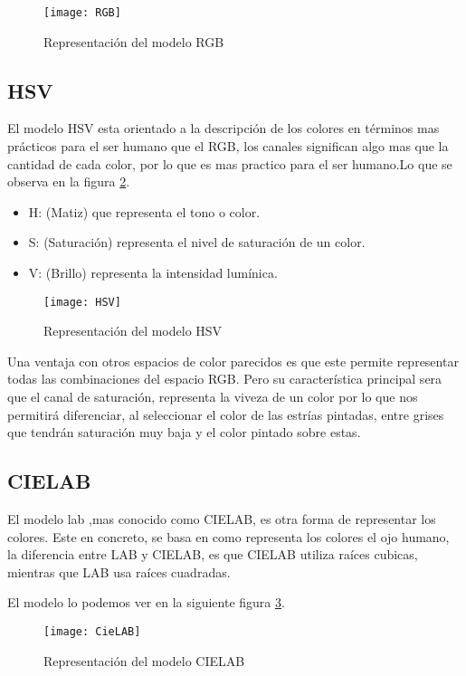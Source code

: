 \begin{figure}[h]
\centering
\texttt{[image: RGB]}
\caption{Representación del modelo RGB\cite{Manual:HAE}}
\label{fig:3.3}
\end{figure}

\subsection{HSV}
El modelo HSV \cite{modelo:hsv} esta orientado a la descripción de los colores en términos mas prácticos para el ser humano que el RGB, los canales significan algo mas que la cantidad de cada color, por lo que es mas practico para el ser humano.Lo que se observa en la figura \ref{fig:3.4}.
 
\begin{itemize}
	\item H: (Matiz) que representa el tono o color.
	\item S: (Saturación) representa el nivel de saturación de un color.
	\item V: (Brillo) representa la intensidad lumínica.
\end{itemize}

\begin{figure}[h]
\centering
\texttt{[image: HSV]}
\caption{Representación del modelo HSV\cite{Manual:HAE}}
\label{fig:3.4}
\end{figure}

Una ventaja con otros espacios de color parecidos es que este permite representar todas las combinaciones del espacio RGB.
Pero su característica principal sera que el canal de saturación, representa la viveza de un color por lo que nos permitirá diferenciar, al seleccionar el color de las estrías pintadas, entre grises que tendrán saturación muy baja y el color pintado sobre estas.

\subsection{CIELAB}
El modelo lab \cite{wiki:lab},mas conocido como CIELAB, es otra forma de representar los colores. Este en concreto, se basa en como representa los colores el ojo humano, la diferencia entre LAB y CIELAB, es que CIELAB utiliza raíces cubicas, mientras que LAB usa raíces cuadradas.

El modelo lo podemos ver en la siguiente figura  \ref{fig:3.8}.

\begin{figure}[h]
\centering
\texttt{[image: CieLAB]}
\caption{Representación del modelo CIELAB\cite{cie:LAB}}
\label{fig:3.8}
\end{figure}


